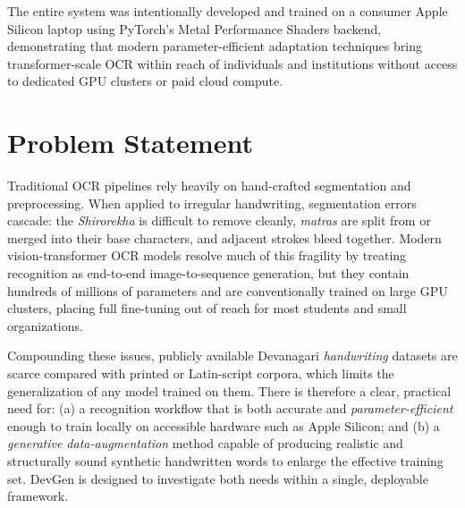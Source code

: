 \documentclass[12pt,a4paper]{report}
\begin{document}
The entire system was intentionally developed and trained on a consumer Apple Silicon laptop using PyTorch's Metal Performance Shaders backend, demonstrating that modern parameter-efficient adaptation techniques bring transformer-scale OCR within reach of individuals and institutions without access to dedicated GPU clusters or paid cloud compute.

\section{Problem Statement}
Traditional OCR pipelines rely heavily on hand-crafted segmentation and preprocessing. When applied to irregular handwriting, segmentation errors cascade: the \textit{Shirorekha} is difficult to remove cleanly, \textit{matras} are split from or merged into their base characters, and adjacent strokes bleed together. Modern vision-transformer OCR models resolve much of this fragility by treating recognition as end-to-end image-to-sequence generation, but they contain hundreds of millions of parameters and are conventionally trained on large GPU clusters, placing full fine-tuning out of reach for most students and small organizations.

Compounding these issues, publicly available Devanagari \textit{handwriting} datasets are scarce compared with printed or Latin-script corpora, which limits the generalization of any model trained on them. There is therefore a clear, practical need for: (a) a recognition workflow that is both accurate and \textit{parameter-efficient} enough to train locally on accessible hardware such as Apple Silicon; and (b) a \textit{generative data-augmentation} method capable of producing realistic and structurally sound synthetic handwritten words to enlarge the effective training set. DevGen is designed to investigate both needs within a single, deployable framework.
\end{document}
